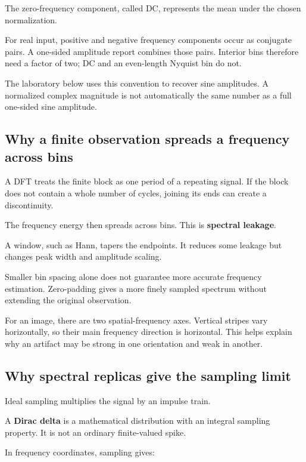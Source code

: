 The zero-frequency component, called DC, represents the mean under the chosen normalization.

For real input, positive and negative frequency components occur as conjugate pairs. A one-sided amplitude report combines those pairs. Interior bins therefore need a factor of two; DC and an even-length Nyquist bin do not.

The laboratory below uses this convention to recover sine amplitudes. A normalized complex magnitude is not automatically the same number as a full one-sided sine amplitude.

\subsection{Why a finite observation spreads a frequency across bins}\label{04-visual-computing-ii-ch043-why-a-finite-observation-spreads-a-frequency-across-bins}

A DFT treats the finite block as one period of a repeating signal. If the block does not contain a whole number of cycles, joining its ends can create a discontinuity.

The frequency energy then spreads across bins. This is \textbf{spectral leakage}.

A window, such as Hann, tapers the endpoints. It reduces some leakage but changes peak width and amplitude scaling.

Smaller bin spacing alone does not guarantee more accurate frequency estimation. Zero-padding gives a more finely sampled spectrum without extending the original observation.

For an image, there are two spatial-frequency axes. Vertical stripes vary horizontally, so their main frequency direction is horizontal. This helps explain why an artifact may be strong in one orientation and weak in another.

\subsection{Why spectral replicas give the sampling limit}\label{04-visual-computing-ii-ch043-why-spectral-replicas-give-the-sampling-limit}

Ideal sampling multiplies the signal by an impulse train.

A \textbf{Dirac delta} is a mathematical distribution with an integral sampling property. It is not an ordinary finite-valued spike.

In frequency coordinates, sampling gives:

